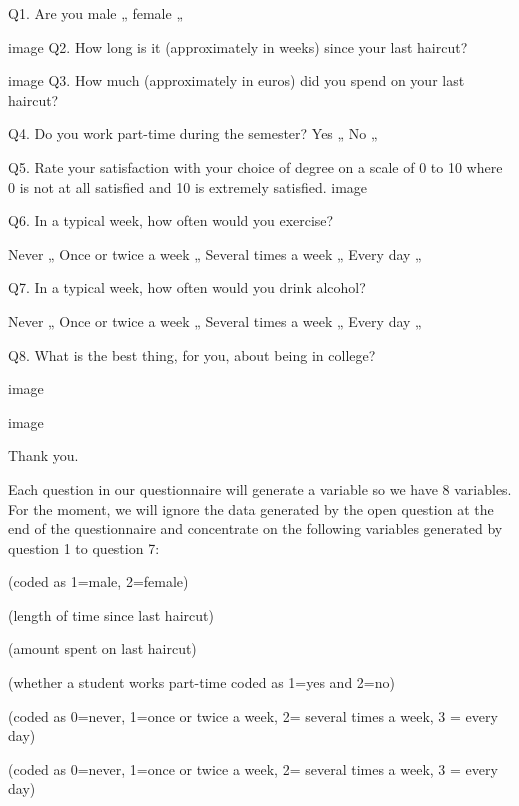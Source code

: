  
Q1.  Are you       male  „
                        female              „
 
 
image Q2.  How long is it (approximately in weeks) since your last haircut?
 
 
image Q3. How much (approximately in euros) did you spend on your last haircut?
 
 
Q4. Do you work part-time during the semester?   Yes   „
                                                                        No    „
 
 
Q5. Rate your satisfaction with your choice of degree on a scale of 0 to 10 where 0 is not at all satisfied and 10 is extremely satisfied.
image
 
Q6. In a typical week, how often would you exercise?
 
Never     „
Once or twice a week  „
          Several times a week  „
          Every day    „
 
Q7. In a typical week, how often would you drink alcohol?
 
Never     „
Once or twice a week  „
          Several times a week  „
          Every day    „
 
 
Q8. What is the best thing, for you, about being in college?
 
image
 
image
 
Thank you.
 
 
 
 
 
 
 
Each question in our questionnaire will generate a variable so we have 8 variables. For the moment, we will ignore the data generated by the open question at the end of the questionnaire and concentrate on the following variables generated by question 1 to question 7:
 
\item[Gender] (coded as 1=male, 2=female)
\item[HcutTime] (length of time since last haircut)
\item[HcutCost] (amount spent on last haircut)
\item[Work] (whether a student works part-time coded as 1=yes and 2=no)
\item[Satisfaction]
\item[Exercise] (coded as 0=never, 1=once or twice a week, 2= several times a week, 3 = every day)
\item[Alcohol] (coded as 0=never, 1=once or twice a week, 2= several times a week, 3 = every day)
 
